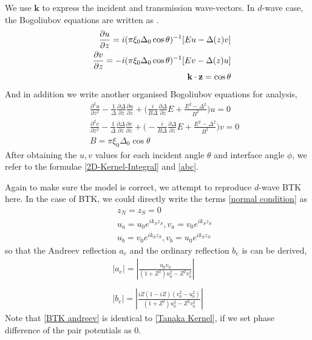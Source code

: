 We use $\mathbf{k}$ to express the incident and transmission wave-vectors. In $d$-wave case, the Bogoliubov equations are written as \citep{Reference11}.
\begin{eqnarray}\label{d wave BdG}
&&\DF{\partial u}{\partial z}=i(\pi \xi_0\Delta_0\cos\theta)^{-1}[Eu-\Delta(z)v]\nonumber\\
&&\DF{\partial v}{\partial z}=-i(\pi \xi_0\Delta_0\cos\theta)^{-1}[Ev-\Delta(z)u]\nonumber\\
&&\mathbf{k}\cdot\mathbf{z} = \cos\theta
\end{eqnarray}
And in addition we write another organised Bogoliubov equations for analysis,
\begin{eqnarray}\label{BdG second order}
&&\frac{\partial^2u}{\partial z^2}-\frac{1}{\Delta}\frac{\partial \Delta}{\partial z}\frac{\partial u}{\partial z}+\Big(\frac{i}{B\Delta}\frac{\partial \Delta}{\partial z}E+\frac{E^2-\Delta^2}{B^2}\Big)u=0\nonumber\\
&&\frac{\partial^2v}{\partial z^2}-\frac{1}{\Delta}\frac{\partial \Delta}{\partial z}\frac{\partial v}{\partial z}+\Big(-\frac{i}{B\Delta}\frac{\partial \Delta}{\partial z}E+\frac{E^2-\Delta^2}{B^2}\Big)v=0\\
&&B=\pi\xi_0\Delta_0\cos\theta\nonumber
\end{eqnarray}
After obtaining the $u,v$ values for each incident angle $\theta$ and interface angle $\phi$, we refer to the formulae \eqref{2D-Kernel-Integral} and \eqref{abc}.

Again to make sure the model is correct, we attempt to reproduce $d$-wave BTK here. 
In the case of BTK, we could directly write the terms \eqref{normal condition} as
\begin{eqnarray}\label{BTK normal condition}
&&z_N=z_S=0\nonumber\\
&&u_a=u_0e^{ik_Sz_S},v_a=v_0e^{ik_Sz_S}\nonumber\\
&&u_b=v_0e^{ik_Sz_S},v_b=u_0e^{ik_Sz_S}
\end{eqnarray}
so that the Andreev reflection $a_e$ and the ordinary reflection $b_e$ is can be derived,
\begin{eqnarray}\label{BTK andreev}
|a_e|=\left|\frac{u_0v_0}{(1+Z^2)u_0^2-Z^2v_0^2}\right|\nonumber\\
\\
|b_e|=\left|\frac{iZ(1-iZ)(v_0^2-u_0^2)}{(1+Z^2)u_0^2-Z^2v_0^2}\right|\nonumber
\end{eqnarray}
Note that \eqref{BTK andreev} is identical to \eqref{Tanaka Kernel}, if we set phase difference of the pair potentials as $0$.

